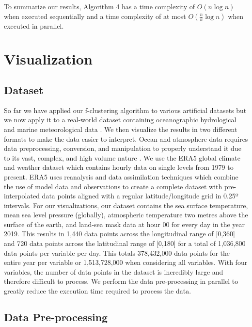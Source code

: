 \documentclass[conference,compsoc]{IEEEtran}
\begin{document}
To summarize our results, Algorithm 4 has a time complexity of $O(n \log n)$ when executed sequentially and a time complexity of at most $O(\frac{n}{k} \log n)$ when executed in parallel.

\section{Visualization}

\subsection{Dataset}

So far we have applied our f-clustering algorithm to various artificial datasets but we now apply it to a real-world dataset containing oceanographic hydrological and marine meteorological data \cite{b4}. We then visualize the results in two different formats to make the data easier to interpret. Ocean and atmosphere data requires data preprocessing, conversion, and manipulation to properly understand it due to its vast, complex, and high volume nature \cite{b4}. We use the ERA5 global climate and weather dataset which contains hourly data on single levels from 1979 to present. ERA5 uses reanalysis and data assimilation techniques which combine the use of model data and observations to create a complete dataset with pre-interpolated data points aligned with a regular latitude/longitude grid in 0.25º intervals. For our visualizations, our dataset contains the sea surface temperature, mean sea level pressure (globally), atmospheric temperature two metres above the surface of the earth, and land-sea mask data at hour 00 for every day in the year 2019. This results in 1,440 data points across the longitudinal range of [0,360] and 720 data points across the latitudinal range of [0,180] for a total of 1,036,800 data points per variable per day. This totals 378,432,000 data points for the entire year per variable or 1,513,728,000 when considering all variables. With four variables, the number of data points in the dataset is incredibly large and therefore difficult to process. We perform the data pre-processing in parallel to greatly reduce the execution time required to process the data.

\subsection{Data Pre-processing}
\end{document}
